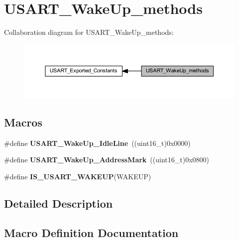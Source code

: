 \hypertarget{group___u_s_a_r_t___wake_up__methods}{}\section{U\+S\+A\+R\+T\+\_\+\+Wake\+Up\+\_\+methods}
\label{group___u_s_a_r_t___wake_up__methods}
Collaboration diagram for U\+S\+A\+R\+T\+\_\+\+Wake\+Up\+\_\+methods\+:
\nopagebreak
\begin{figure}[H]
\begin{center}
\leavevmode
\includegraphics[width=350pt]{group___u_s_a_r_t___wake_up__methods}
\end{center}
\end{figure}
\subsection*{Macros}
\begin{DoxyCompactItemize}
\item 
\mbox{\label{group___u_s_a_r_t___wake_up__methods_ga9646d71590d5cef29ee12da0bb431d92}} 
\#define {\bfseries U\+S\+A\+R\+T\+\_\+\+Wake\+Up\+\_\+\+Idle\+Line}~((uint16\+\_\+t)0x0000)
\item 
\mbox{\label{group___u_s_a_r_t___wake_up__methods_ga9f63c1671060682adee91b9a2f3202e4}} 
\#define {\bfseries U\+S\+A\+R\+T\+\_\+\+Wake\+Up\+\_\+\+Address\+Mark}~((uint16\+\_\+t)0x0800)
\item 
\#define {\bfseries I\+S\+\_\+\+U\+S\+A\+R\+T\+\_\+\+W\+A\+K\+E\+UP}(W\+A\+K\+E\+UP)
\end{DoxyCompactItemize}


\subsection{Detailed Description}


\subsection{Macro Definition Documentation}
\mbox{\label{group___u_s_a_r_t___wake_up__methods_ga3611be417bdb82f42dc2ca17584271f9}} 
